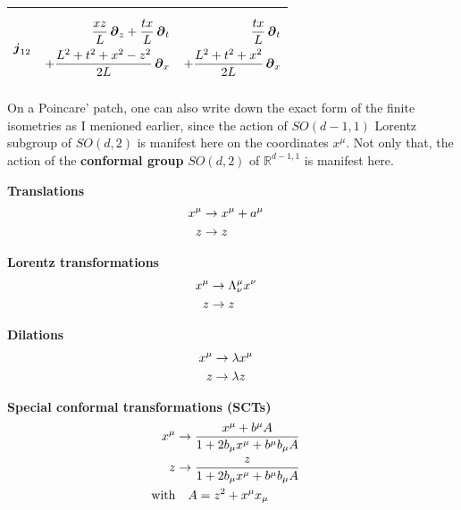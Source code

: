 \documentclass[a4paper,12pt]{article}
\begin{document}
\begin{table}[H]
\begin{adjustbox}{width=0.80\textwidth}
\begin{tabular}{ccc}
                     $\boldsymbol{j}_{1 2}$ & \parbox{0.3\textwidth}{\begin{equation*}
                        \begin{split}
                           \frac{x z}{L} \, \boldsymbol{\partial}_z + \frac{t x}{L} \, \boldsymbol{\partial}_t \\ + \frac{L^2 + t^2 + x^2 - z^2}{2 L} \, \boldsymbol{\partial}_x
                        \end{split}
                     \end{equation*}} & \parbox{0.3\textwidth}{\begin{equation*}
                        \begin{split}
                           \frac{t x}{L} \, \boldsymbol{\partial}_t \\ + \frac{L^2 + t^2 + x^2}{2 L} \, \boldsymbol{\partial}_x
                        \end{split}
                     \end{equation*}} \\
                  \bottomrule
               \end{tabular}
            \end{adjustbox}
         \end{table}

         On a Poincare' patch, one can also write down the exact form of the finite isometries as I menioned earlier, since the action of $\mathit{SO}(d-1, 1)$ Lorentz subgroup of $\mathit{SO}(d, 2)$ is manifest here on the coordinates $x^\mu$. Not only that, the action of the \textbf{conformal group} $\mathit{SO}(d, 2)$ of $\mathbb{R}^{d-1, 1}$ is manifest here.

         \parbox{0.5\textwidth}{{\bfseries Translations}
         \begin{align*}
            x^\mu &\to x^\mu + a^\mu \cr
            z &\to z
         \end{align*}}%
         \parbox{0.5\textwidth}{{\bfseries Lorentz transformations}
         \begin{align*}
            x^\mu &\to \Lambda^{\mu}_{\nu} x^{\nu} \cr
            z &\to z
         \end{align*}}

         \parbox{0.5\textwidth}{{\bfseries Dilations}
         \begin{align*}
            x^\mu &\to \lambda x^\mu \cr
            z &\to \lambda z
         \end{align*}}%
         \parbox{0.5\textwidth}{{\bfseries Special conformal transformations (SCTs)}
         \begin{align*}
            x^\mu &\to \frac{x^{\mu} + b^{\mu} A}{1 + 2 b_{\mu} x^{\mu} + b^{\mu} b_{\mu} A} \cr
            z &\to \frac{z}{1 + 2 b_{\mu} x^{\mu} + b^{\mu} b_{\mu} A} \cr
            \text{with} &\quad A = z^2 + x^{\mu} x_{\mu}
         \end{align*}}%
\end{document}
